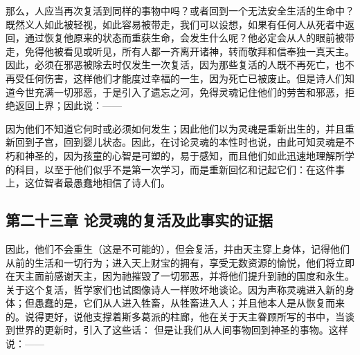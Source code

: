 那么，人应当再次复活到同样的事物中吗？或者回到一个无法安全生活的生命中？既然义人如此被轻视，如此容易被带走，我们可以设想，如果有任何人从死者中返回，通过恢复他原来的状态而重获生命，会发生什么呢？他必定会从人的眼前被带走，免得他被看见或听见，所有人都一齐离开诸神，转而敬拜和信奉独一真天主。因此，必须在邪恶被除去时仅发生一次复活，因为那些复活的人既不再死亡，也不再受任何伤害，这样他们才能度过幸福的一生，因为死亡已被废止。但是诗人们知道今世充满一切邪恶，于是引入了遗忘之河，免得灵魂记住他们的劳苦和邪恶，拒绝返回上界；因此说：——\par

\par

因为他们不知道它何时或必须如何发生；因此他们以为灵魂是重新出生的，并且重新回到子宫，回到婴儿状态。因此，在讨论灵魂的本性时也说，由此可知灵魂是不朽和神圣的，因为孩童的心智是可塑的，易于感知，而且他们如此迅速地理解所学的科目，以至于他们似乎不是第一次学习，而是重新回忆和记起它们：在这件事上，这位智者最愚蠢地相信了诗人们。\par


\subsection{第二十三章 论灵魂的复活及此事实的证据}

因此，他们不会重生（这是不可能的），但会复活，并由天主穿上身体，记得他们从前的生活和一切行为；进入天上财宝的拥有，享受无数资源的愉悦，他们将立即在天主面前感谢天主，因为祂摧毁了一切邪恶，并将他们提升到祂的国度和永生。关于这个复活，哲学家们也试图像诗人一样败坏地谈论。因为声称灵魂进入新的身体；但愚蠢的是，它们从人进入牲畜，从牲畜进入人；并且他本人是从恢复而来的。说得更好，说他支撑着斯多葛派的柱廊，他在关于天主眷顾所写的书中，当谈到世界的更新时，引入了这些话： 但是让我们从人间事物回到神圣的事物。这样说：——\par

